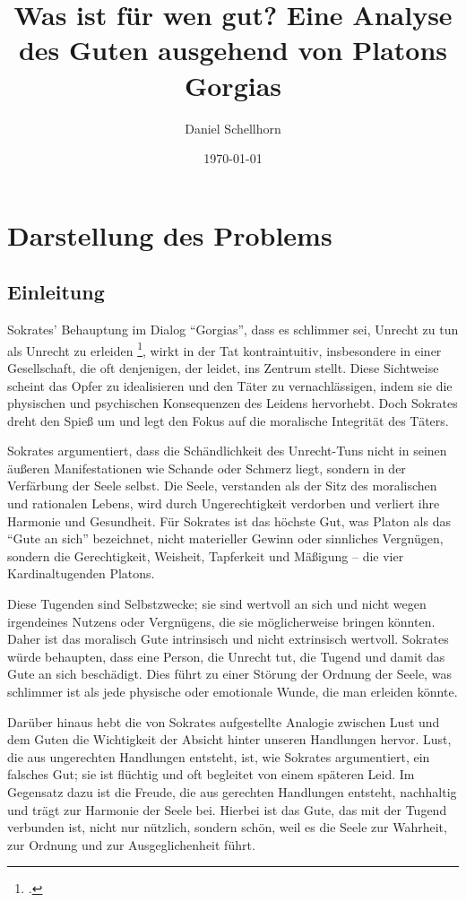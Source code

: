 \documentclass[12pt,a4paper]{article}
\title{Was ist für wen gut? Eine Analyse des Guten ausgehend von Platons Gorgias}
\author{Daniel Schellhorn}
\date{\today}
\begin{document}
\maketitle

\section{Darstellung des Problems}
\subsection[short]{Einleitung}
Sokrates' Behauptung im Dialog \enquote{Gorgias}, dass es schlimmer sei, Unrecht zu tun als Unrecht zu erleiden \footcite[475e]{gorgias}, wirkt in der Tat kontraintuitiv, insbesondere in einer Gesellschaft, die oft denjenigen, der leidet, ins Zentrum stellt. Diese Sichtweise scheint das Opfer zu idealisieren und den Täter zu vernachlässigen, indem sie die physischen und psychischen Konsequenzen des Leidens hervorhebt. Doch Sokrates dreht den Spieß um und legt den Fokus auf die moralische Integrität des Täters.

Sokrates argumentiert, dass die Schändlichkeit des Unrecht-Tuns nicht in seinen äußeren Manifestationen wie Schande oder Schmerz liegt, sondern in der Verfärbung der Seele selbst. Die Seele, verstanden als der Sitz des moralischen und rationalen Lebens, wird durch Ungerechtigkeit verdorben und verliert ihre Harmonie und Gesundheit.  Für Sokrates ist das höchste Gut, was Platon als das \enquote{Gute an sich} bezeichnet, nicht materieller Gewinn oder sinnliches Vergnügen, sondern die Gerechtigkeit, Weisheit, Tapferkeit und Mäßigung – die vier Kardinaltugenden Platons.

Diese Tugenden sind Selbstzwecke; sie sind wertvoll an sich und nicht wegen irgendeines Nutzens oder Vergnügens, die sie möglicherweise bringen könnten. Daher ist das moralisch Gute intrinsisch und nicht extrinsisch wertvoll. Sokrates würde behaupten, dass eine Person, die Unrecht tut, die Tugend und damit das Gute an sich beschädigt. Dies führt zu einer Störung der Ordnung der Seele, was schlimmer ist als jede physische oder emotionale Wunde, die man erleiden könnte.

Darüber hinaus hebt die von Sokrates aufgestellte Analogie zwischen Lust und dem Guten die Wichtigkeit der Absicht hinter unseren Handlungen hervor. Lust, die aus ungerechten Handlungen entsteht, ist, wie Sokrates argumentiert, ein falsches Gut; sie ist flüchtig und oft begleitet von einem späteren Leid. Im Gegensatz dazu ist die Freude, die aus gerechten Handlungen entsteht, nachhaltig und trägt zur Harmonie der Seele bei. Hierbei ist das Gute, das mit der Tugend verbunden ist, nicht nur nützlich, sondern schön, weil es die Seele zur Wahrheit, zur Ordnung und zur Ausgeglichenheit führt.
\end{document}
